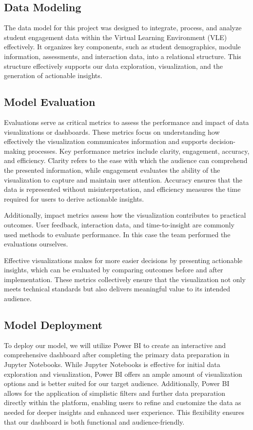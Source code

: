 \subsection*{Data Modeling}
The data model for this project was designed to integrate, process, and analyze student engagement data within the Virtual Learning Environment (VLE) effectively. It organizes key components, such as student demographics, module information, assessments, and interaction data, into a relational structure. This structure effectively supports our data exploration, visualization, and the generation of actionable insights.


\subsection*{Model Evaluation}
Evaluations serve as critical metrics to assess the performance and impact of data visualizations or dashboards. These metrics focus on understanding how effectively the visualization communicates information and supports decision-making processes. Key performance metrics include clarity, engagement, accuracy, and efficiency. Clarity refers to the ease with which the audience can comprehend the presented information, while engagement evaluates the ability of the visualization to capture and maintain user attention. Accuracy ensures that the data is represented without misinterpretation, and efficiency measures the time required for users to derive actionable insights.

Additionally, impact metrics assess how the visualization contributes to practical outcomes. User feedback, interaction data, and time-to-insight are commonly used methods to evaluate performance. In this case the team performed the evaluations ourselves. 

Effective visualizations makes for more easier decisions by presenting actionable insights, which can be evaluated by comparing outcomes before and after implementation. These metrics collectively ensure that the visualization not only meets technical standards but also delivers meaningful value to its intended audience.

\subsection*{Model Deployment}
To deploy our model, we will utilize Power BI to create an interactive and comprehensive dashboard after completing the primary data preparation in Jupyter Notebooks. While Jupyter Notebooks is effective for initial data exploration and visualization, Power BI offers an ample amount of visualization options and is better suited for our target audience. Additionally, Power BI allows for the application of simplistic filters and further data preparation directly within the platform, enabling users to refine and customize the data as needed for deeper insights and enhanced user experience. This flexibility ensures that our dashboard is both functional and audience-friendly.

